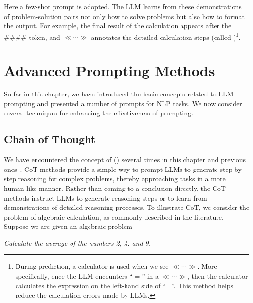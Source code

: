\noindent Here a few-shot prompt is adopted. The LLM learns from these demonstrations of problem-solution pairs not only how to solve problems but also how to format the output. For example, the final result of the calculation appears after the \#\#\#\# token, and $\ll \cdots \gg$ annotates the detailed calculation steps (called )\footnote{During prediction, a calculator is used when we see $\ll \cdots \gg$. More specifically, once the LLM encounters ``$=$'' in a $\ll \cdots \gg$, then the calculator calculates the expression on the left-hand side of ``=''. This method helps reduce the calculation errors made by LLMs.}.


\section{Advanced Prompting Methods}
\label{sec:advanced-prompting}

\noindent So far in this chapter, we have introduced the basic concepts related to LLM prompting and presented a number of prompts for NLP tasks. We now consider several techniques for enhancing the effectiveness of prompting.

\subsection{Chain of Thought}
\label{sec:chain-of-thought}

\noindent We have encountered the concept of  () several times in this chapter and previous ones~\cite{wei-etal:2022chain,chowdhery-etal:2022palm}. CoT methods provide a simple way to prompt LLMs to generate step-by-step reasoning for complex problems, thereby approaching tasks in a more human-like manner. Rather than coming to a conclusion directly, the CoT methods instruct LLMs to generate reasoning steps or to learn from demonstrations of detailed reasoning processes. To illustrate CoT, we consider the problem of algebraic calculation, as commonly described in the literature. Suppose we are given an algebraic problem

\vspace{0.8em}

\hspace{5em} \textit{Calculate the average of the numbers 2, 4, and 9.}

